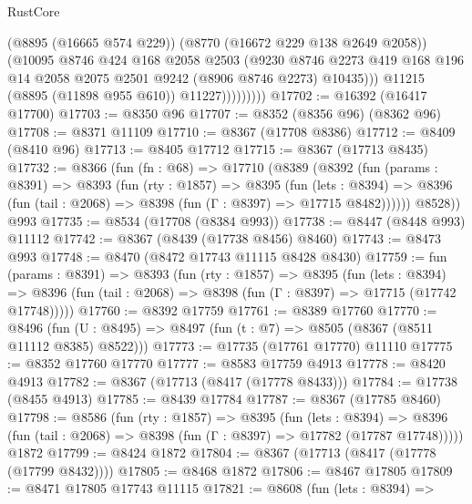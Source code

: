 \begin{lexlean}{RustCore}
\begin{coremodule}
                        (@8895 (@16665 @574 @229))
                        (@8770 (@16672 @229 @138 @2649 @2058))
                        (@10095
                          @8746
                          @424
                          @168
                          @2058
                          @2503
                          (@9230
                            @8746
                            @2273
                            @419
                            @168
                            @196
                            @14
                            @2058
                            @2075
                            @2501
                            @9242
                            (@8906 @8746 @2273)
                            @10435)))
                      @11215
                      (@8895 (@11898 @955 @610))
                      @11227)))))))))
@17702 := @16392 (@16417 @17700)
@17703 := @8350 @96
@17707 := @8352 (@8356 @96) (@8362 @96)
@17708 := @8371 @11109
@17710 := @8367 (@17708 @8386)
@17712 := @8409 (@8410 @96)
@17713 := @8405 @17712
@17715 := @8367 (@17713 @8435)
@17732 := @8366
    (fun (fn : @68) =>
    @17710
      (@8389
        (@8392
          (fun (params : @8391) =>
          @8393
            (fun (rty : @1857) =>
            @8395
              (fun (lets : @8394) =>
              @8396 (fun (tail : @2068) => @8398 (fun (Γ : @8397) => @17715 @8482))))))
        @8528))
    @993
@17735 := @8534 (@17708 (@8384 @993))
@17738 := @8447 (@8448 @993) @11112
@17742 := @8367 (@8439 (@17738 @8456) @8460)
@17743 := @8473 @993
@17748 := @8470 (@8472 @17743 @11115 @8428 @8430)
@17759 := fun (params : @8391) =>
  @8393
    (fun (rty : @1857) =>
    @8395
      (fun (lets : @8394) =>
      @8396 (fun (tail : @2068) => @8398 (fun (Γ : @8397) => @17715 (@17742 @17748)))))
@17760 := @8392 @17759
@17761 := @8389 @17760
@17770 := @8496
    (fun (U : @8495) => @8497 (fun (t : @7) => @8505 (@8367 (@8511 @11112 @8385) @8522)))
@17773 := @17735 (@17761 @17770) @11110
@17775 := @8352 @17760 @17770
@17777 := @8583 @17759 @4913
@17778 := @8420 @4913
@17782 := @8367 (@17713 (@8417 (@17778 @8433)))
@17784 := @17738 (@8455 @4913)
@17785 := @8439 @17784
@17787 := @8367 (@17785 @8460)
@17798 := @8586
    (fun (rty : @1857) =>
    @8395
      (fun (lets : @8394) =>
      @8396 (fun (tail : @2068) => @8398 (fun (Γ : @8397) => @17782 (@17787 @17748)))))
    @1872
@17799 := @8424 @1872
@17804 := @8367 (@17713 (@8417 (@17778 (@17799 @8432))))
@17805 := @8468 @1872
@17806 := @8467 @17805
@17809 := @8471 @17805 @17743 @11115
@17821 := @8608
    (fun (lets : @8394) =>

\end{coremodule}
\end{lexlean}
